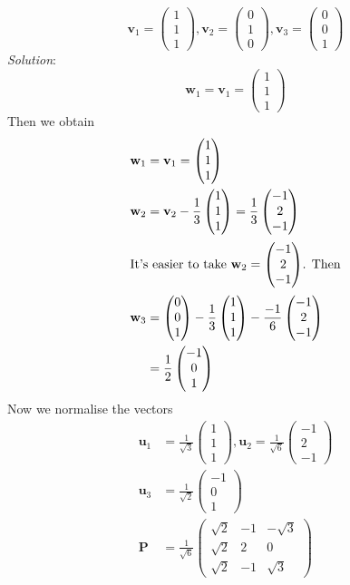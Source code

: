 \documentclass{report}
\theoremstyle{remark}
\theoremstyle{definition}
\theoremstyle{definition}
\theoremstyle{theorem}
\renewcommand{\v}[1]{\mathbf{#1}}
\providecommand{\vectiii}[3]{\begin{pmatrix}#1\\#2\\#3\end{pmatrix}}
\begin{document}
\[\v{v}_1=\vectiii{1}{1}{1}, \v{v}_2=\vectiii{0}{1}{0}, \v{v}_3=\vectiii{0}{0}{1}\]
\emph{Solution}:
\[\v{w}_1=\v{v}_1=\vectiii{1}{1}{1}\]
Then we obtain
\begin{align*}
    \v{w}_1&=\v{v}_1=\vectiii{1}{1}{1}\\
    \v{w}_2&=\v{v}_2-\frac{1}{3}\vectiii{1}{1}{1}=\frac{1}{3}\vectiii{-1}{2}{-1}\\
    \intertext{It's easier to take $\v{w}_2=\vectiii{-1}{2}{-1}$. Then}
    \v{w}_3&=\vectiii{0}{0}{1}-\frac{1}{3}\vectiii{1}{1}{1}-\frac{-1}{6}\vectiii{-1}{2}{-1}\\
    &=\frac{1}{2}\vectiii{-1}{0}{1}
\end{align*}
Now we normalise the vectors
\begin{align*}
    \v{u}_1&=\frac{1}{\sqrt{3}}\vectiii{1}{1}{1}, \v{u}_2=\frac{1}{\sqrt{6}}\vectiii{-1}{2}{-1}\\
    \v{u}_3&=\frac{1}{\sqrt{2}}\vectiii{-1}{0}{1}\\
    \v{P}&=\frac{1}{\sqrt{6}}\begin{pmatrix}
    \sqrt{2}&-1&-\sqrt{3}\\
    \sqrt{2}&2&0\\
    \sqrt{2}&-1&\sqrt{3}
    \end{pmatrix}
\end{align*}
\end{document}
